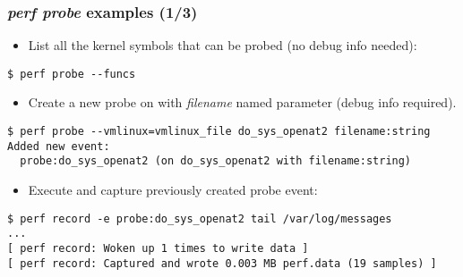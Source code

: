 \begin{frame}[fragile]
  \frametitle{{\em perf probe} examples (1/3)}
  \begin{itemize}
    \item List all the kernel symbols that can be probed (no debug info needed):
  \end{itemize}
  \begin{block}{}
    \begin{verbatim}
$ perf probe --funcs
    \end{verbatim}
  \end{block}
  \begin{itemize}
    \item Create a new probe on  with {\em filename}
          named parameter (debug info required).
  \end{itemize}
  \begin{block}{}
    \begin{verbatim}
$ perf probe --vmlinux=vmlinux_file do_sys_openat2 filename:string
Added new event:
  probe:do_sys_openat2 (on do_sys_openat2 with filename:string)
    \end{verbatim}
  \end{block}
  \begin{itemize}
    \item Execute  and capture previously created probe event:
  \end{itemize}
  \begin{block}{}
    \begin{verbatim}
$ perf record -e probe:do_sys_openat2 tail /var/log/messages
...
[ perf record: Woken up 1 times to write data ]
[ perf record: Captured and wrote 0.003 MB perf.data (19 samples) ]
    \end{verbatim}
  \end{block}
\end{frame}

